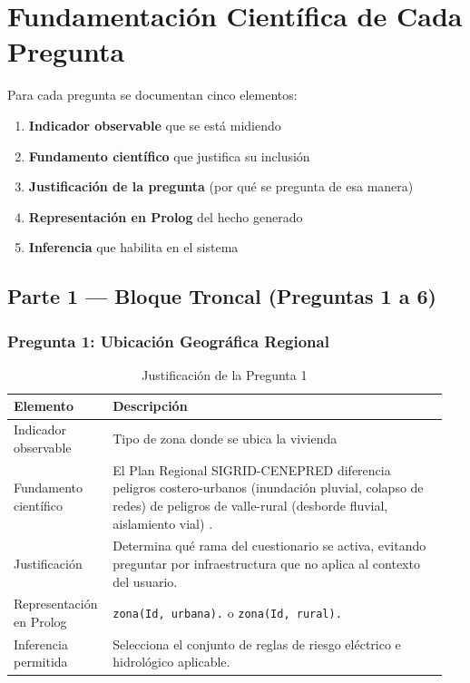 \documentclass[12pt, letterpaper]{article}
\begin{document}
\section{Fundamentación Científica de Cada Pregunta}

Para cada pregunta se documentan cinco elementos:

\begin{enumerate}
  \item \textbf{Indicador observable} que se está midiendo
  \item \textbf{Fundamento científico} que justifica su inclusión
  \item \textbf{Justificación de la pregunta} (por qué se pregunta de esa manera)
  \item \textbf{Representación en Prolog} del hecho generado
  \item \textbf{Inferencia} que habilita en el sistema
\end{enumerate}

\subsection{Parte 1 — Bloque Troncal (Preguntas 1 a 6)}

\subsubsection*{Pregunta 1: Ubicación Geográfica Regional}
\begin{table}[H]
\centering
\caption{Justificación de la Pregunta 1}
\label{tab:p1}
\begin{tabular}{@{}p{0.2\linewidth}p{0.75\linewidth}@{}}
\toprule
\textbf{Elemento} & \textbf{Descripción} \\ \midrule
Indicador observable & Tipo de zona donde se ubica la vivienda \\
Fundamento científico & El Plan Regional SIGRID-CENEPRED diferencia peligros costero-urbanos (inundación pluvial, colapso de redes) de peligros de valle-rural (desborde fluvial, aislamiento vial) \parencite{gob_regional_lambayeque_2023}. \\
Justificación & Determina qué rama del cuestionario se activa, evitando preguntar por infraestructura que no aplica al contexto del usuario. \\
Representación en Prolog & \texttt{zona(Id, urbana).} o \texttt{zona(Id, rural).} \\
Inferencia permitida & Selecciona el conjunto de reglas de riesgo eléctrico e hidrológico aplicable. \\ \bottomrule
\end{tabular}
\end{table}
\end{document}
